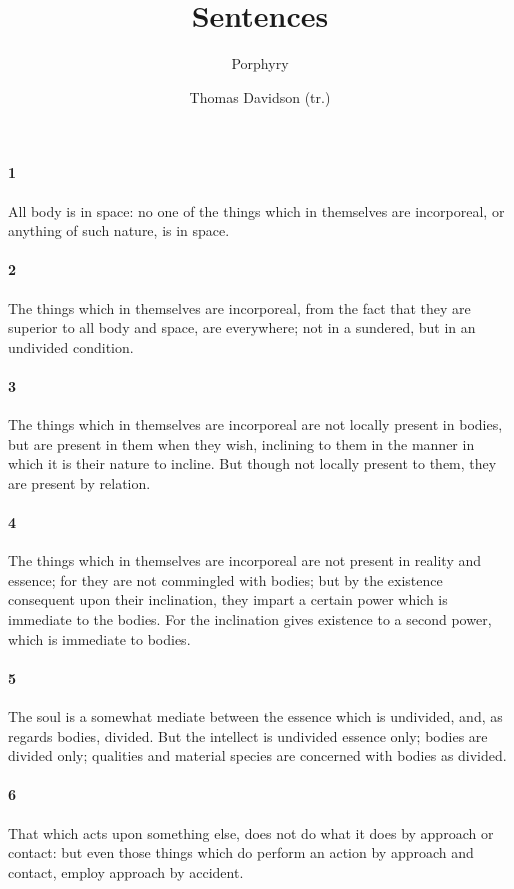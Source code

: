 \documentclass{article}
\title{Sentences}
\author{Porphyry \and Thomas Davidson (tr.)}
\date{}
\begin{document}
\maketitle

\paragraph{1} All body is in space: no one of the things which in themselves are incorporeal, or anything of such nature, is in space.

\paragraph{2} The things which in themselves are incorporeal, from the fact that they are superior to all body and space, are everywhere; not in a sundered, but in an undivided condition.

\paragraph{3} The things which in themselves are incorporeal are not locally present in bodies, but are present in them when they wish, inclining to them in the manner in which it is their nature to incline. But though not locally present to them, they are present by relation.

\paragraph{4} The things which in themselves are incorporeal are not present in reality and essence; for they are not commingled with bodies; but by the existence consequent upon their inclination, they impart a certain power which is immediate to the bodies. For the inclination gives existence to a second power, which is immediate to bodies.

\paragraph{5} The soul is a somewhat mediate between the essence which is undivided, and, as regards bodies, divided. But the intellect is undivided essence only; bodies are divided only; qualities and material species are concerned with bodies as divided.

\paragraph{6} That which acts upon something else, does not do what it does by approach or contact: but even those things which do perform an action by approach and contact, employ approach by accident.
\end{document}
